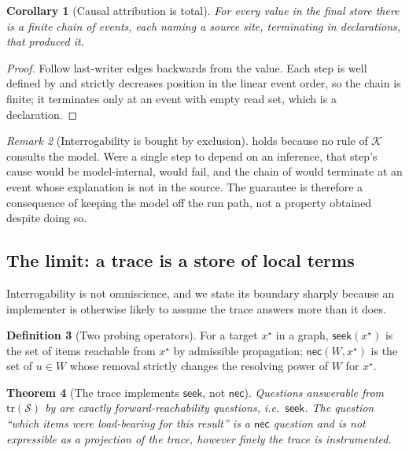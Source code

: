 \documentclass[twocolumn,11pt,a4paper]{article}
\theoremstyle{sup}
\newtheorem{theorem}{Theorem}[section]
\newtheorem{corollary}[theorem]{Corollary}
\theoremstyle{definition}
\newtheorem{definition}[theorem]{Definition}
\theoremstyle{remark}
\newtheorem{remark}[theorem]{Remark}
\newcommand{\Src}{\mathcal{S}}
\newcommand{\Cmp}{\mathcal{K}}
\newcommand{\Tr}{\mathrm{tr}}
\newcommand{\seek}{\mathsf{seek}}
\newcommand{\nec}{\mathsf{nec}}
\begin{document}
\begin{corollary}[Causal attribution is total]
\label{cor:attribution}
For every value in the final store there is a finite chain of events, each
naming a source site, terminating in declarations, that produced it.
\end{corollary}

\begin{proof}
Follow last-writer edges backwards from the value. Each step is well defined by
 and strictly decreases position in the linear event order, so
the chain is finite; it terminates only at an event with empty read set, which
is a declaration.
\end{proof}

\begin{remark}[Interrogability is bought by exclusion]
\label{rem:exclusion-buys}
 holds because no rule of $\Cmp$ consults the model. Were a
single step to depend on an inference, that step's cause would be
model-internal,  would fail, and the chain of
 would terminate at an event whose explanation is not in
the source. The guarantee is therefore a consequence of keeping the model off
the run path, not a property obtained despite doing so.
\end{remark}

\subsection{The limit: a trace is a store of local terms}
\label{sec:probe}

Interrogability is not omniscience, and we state its boundary sharply because
an implementer is otherwise likely to assume the trace answers more than it
does.

\begin{definition}[Two probing operators]
\label{def:two-ops}
For a target $x^\star$ in a graph, $\seek(x^\star)$ is the set of items
reachable from $x^\star$ by admissible propagation; $\nec(W,x^\star)$ is the
set of $u\in W$ whose removal strictly changes the resolving power of $W$ for
$x^\star$.
\end{definition}

\begin{theorem}[The trace implements $\seek$, not $\nec$]
\label{thm:trace-seek}
Questions answerable from $\Tr(\Src)$ by  are exactly
forward-reachability questions, i.e.\ $\seek$. The question ``which items were
load-bearing for this result'' is a $\nec$ question and is not expressible as a
projection of the trace, however finely the trace is instrumented.
\end{theorem}
\end{document}
